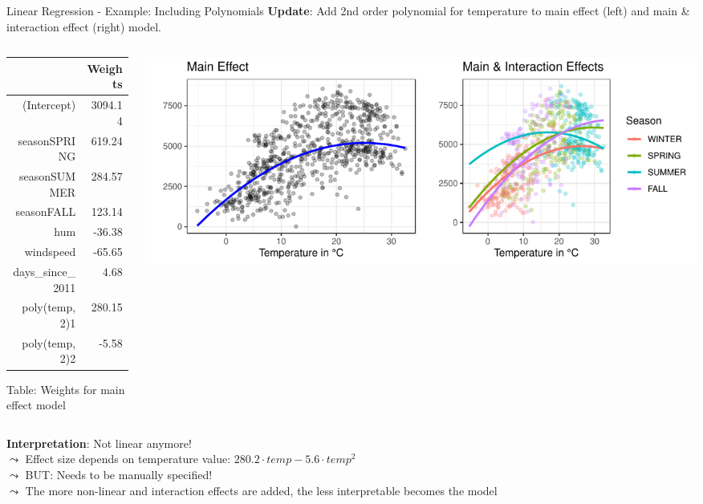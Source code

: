 \documentclass[11pt,compress,t,notes=noshow, aspectratio=169, xcolor=table]{beamer}
\begin{document}
\begin{frame}{Linear Regression - Example: Including Polynomials}
\textbf{Update}: Add 2nd order polynomial for temperature to main effect (left) and main \& interaction effect (right) model.
\begin{columns}[T]
\begin{column}{0.25\textwidth}
\begin{tiny}
\begin{table}[ht]
\centering
\begin{tabular}{rr}
  \hline
 & Weights \\ 
  \hline
(Intercept) & 3094.14 \\ 
  seasonSPRING & 619.24 \\ 
  seasonSUMMER & 284.57 \\ 
  seasonFALL & 123.14 \\ 
  hum & -36.38 \\ 
  windspeed & -65.65 \\ 
  days\_since\_2011 & 4.68 \\ 
  poly(temp, 2)1 & 280.15 \\ 
  poly(temp, 2)2 & -5.58 \\ 
   \hline
\end{tabular}
\end{table}
   Table: Weights for main effect model

\end{tiny}

\end{column}
\begin{column}{0.7\textwidth}
\includegraphics[width = \textwidth]{figure/poly_main_vs_interaction_effects.pdf}
\end{column}
\end{columns}
\vfill
\pause
\textbf{Interpretation}: Not linear anymore!\\ 
$\leadsto$ Effect size depends on temperature value: $280.2 \cdot temp - 5.6 \cdot temp^2$\\
$\leadsto$ BUT: Needs to be manually specified!\\
$\leadsto$ The more non-linear and interaction effects are added, the less interpretable becomes the model
\end{frame}
\end{document}
